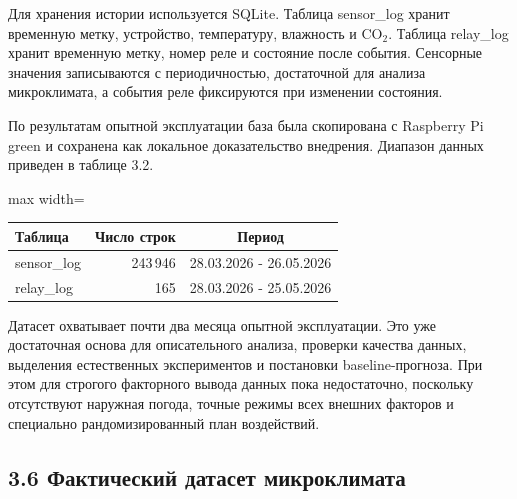 \documentclass[a4paper,14pt]{extarticle}
\newenvironment{vkrlongtab}[1]
  {\par\setlength{\topsep}{2pt}\setlength{\partopsep}{0pt}%
   \begin{center}\singlespacing\small
   \hyphenpenalty=200\relax\exhyphenpenalty=200\relax\hbadness=10000\relax
   \begin{adjustbox}{max width=\linewidth}\begin{tabular}{#1}}
  {\end{tabular}\end{adjustbox}\end{center}\par}
\renewcommand{\texttt}[1]{\textnormal{#1}}
\begin{document}
Для хранения истории используется SQLite. Таблица \texttt{sensor\_log}
хранит временную метку, устройство, температуру, влажность и CO\(_2\).
Таблица \texttt{relay\_log} хранит временную метку, номер реле и
состояние после события. Сенсорные значения записываются с
периодичностью, достаточной для анализа микроклимата, а события реле
фиксируются при изменении состояния.

По результатам опытной эксплуатации база была скопирована с Raspberry Pi
\texttt{green} и сохранена как локальное доказательство внедрения.
Диапазон данных приведен в таблице 3.2.

\par\vspace{10pt}\noindent\begin{minipage}{\linewidth}
\nopagebreak\vspace{-9pt}
\begin{vkrlongtab}{|l|r|c|}
\hline
\textbf{Таблица} & \textbf{Число строк} & \textbf{Период} \\
\hline

\texttt{sensor\_log} & 243\,946 & 28.03.2026 - 26.05.2026 \\
\hline
\texttt{relay\_log} & 165 & 28.03.2026 - 25.05.2026 \\
\hline
\end{vkrlongtab}
\end{minipage}\par\vspace{10pt}

Датасет охватывает почти два месяца опытной эксплуатации. Это уже
достаточная основа для описательного анализа, проверки качества данных,
выделения естественных экспериментов и постановки baseline-прогноза. При
этом для строгого факторного вывода данных пока недостаточно, поскольку
отсутствуют наружная погода, точные режимы всех внешних факторов и
специально рандомизированный план воздействий.

\hypertarget{ux444ux430ux43aux442ux438ux447ux435ux441ux43aux438ux439-ux434ux430ux442ux430ux441ux435ux442-ux43cux438ux43aux440ux43eux43aux43bux438ux43cux430ux442ux430}{%
\subsection{3.6 Фактический датасет
микроклимата}\label{ux444ux430ux43aux442ux438ux447ux435ux441ux43aux438ux439-ux434ux430ux442ux430ux441ux435ux442-ux43cux438ux43aux440ux43eux43aux43bux438ux43cux430ux442ux430}}
\end{document}
